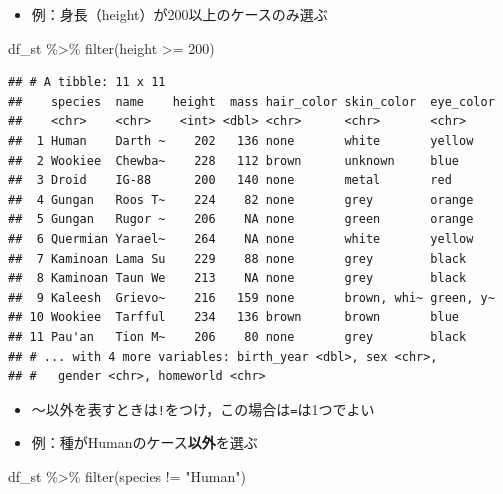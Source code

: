 \documentclass[
  xelatex,ja=standard, b5paper]{bxjsbook}
\newenvironment{Shaded}{\begin{snugshade}}{\end{snugshade}}
\newcommand{\DecValTok}[1]{\textcolor[rgb]{0.00,0.00,0.81}{#1}}
\newcommand{\FunctionTok}[1]{\textcolor[rgb]{0.00,0.00,0.00}{#1}}
\newcommand{\NormalTok}[1]{#1}
\newcommand{\SpecialCharTok}[1]{\textcolor[rgb]{0.00,0.00,0.00}{#1}}
\newcommand{\StringTok}[1]{\textcolor[rgb]{0.31,0.60,0.02}{#1}}
\providecommand{\tightlist}{%
  \setlength{\itemsep}{0pt}\setlength{\parskip}{0pt}}
\begin{document}
\begin{itemize}
\tightlist
\item
  例：身長（height）が200以上のケースのみ選ぶ
\end{itemize}

\begin{Shaded}
\begin{Highlighting}[]
\NormalTok{df\_st }\SpecialCharTok{\%\textgreater{}\%} 
  \FunctionTok{filter}\NormalTok{(height }\SpecialCharTok{\textgreater{}=} \DecValTok{200}\NormalTok{)}
\end{Highlighting}
\end{Shaded}

\begin{verbatim}
## # A tibble: 11 x 11
##    species  name    height  mass hair_color skin_color  eye_color
##    <chr>    <chr>    <int> <dbl> <chr>      <chr>       <chr>    
##  1 Human    Darth ~    202   136 none       white       yellow   
##  2 Wookiee  Chewba~    228   112 brown      unknown     blue     
##  3 Droid    IG-88      200   140 none       metal       red      
##  4 Gungan   Roos T~    224    82 none       grey        orange   
##  5 Gungan   Rugor ~    206    NA none       green       orange   
##  6 Quermian Yarael~    264    NA none       white       yellow   
##  7 Kaminoan Lama Su    229    88 none       grey        black    
##  8 Kaminoan Taun We    213    NA none       grey        black    
##  9 Kaleesh  Grievo~    216   159 none       brown, whi~ green, y~
## 10 Wookiee  Tarfful    234   136 brown      brown       blue     
## 11 Pau'an   Tion M~    206    80 none       grey        black    
## # ... with 4 more variables: birth_year <dbl>, sex <chr>,
## #   gender <chr>, homeworld <chr>
\end{verbatim}

\begin{itemize}
\tightlist
\item
  ～以外を表すときは\texttt{!}をつけ，この場合は\texttt{=}は1つでよい
\item
  例：種がHumanのケース\textbf{以外}を選ぶ
\end{itemize}

\begin{Shaded}
\begin{Highlighting}[]
\NormalTok{df\_st }\SpecialCharTok{\%\textgreater{}\%} 
  \FunctionTok{filter}\NormalTok{(species }\SpecialCharTok{!=} \StringTok{"Human"}\NormalTok{)}
\end{Highlighting}
\end{Shaded}
\end{document}
